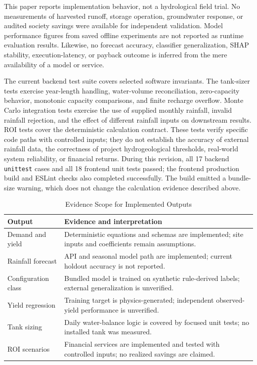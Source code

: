 \documentclass[conference]{IEEEtran}
\begin{document}
This paper reports implementation behavior, not a hydrological field
trial. No measurements of harvested runoff, storage operation, groundwater
response, or audited society savings were available for independent
validation. Model performance figures from saved offline experiments
are not reported as runtime evaluation results. Likewise, no forecast
accuracy, classifier generalization, SHAP stability, execution-latency,
or payback outcome is inferred from the mere availability of a model or
service.

The current backend test suite covers selected software invariants. The
tank-sizer tests exercise year-length handling, water-volume
reconciliation, zero-capacity behavior, monotonic capacity comparisons,
and finite recharge overflow. Monte Carlo integration tests exercise the
use of supplied monthly rainfall, invalid rainfall rejection, and the
effect of different rainfall inputs on downstream results. ROI tests
cover the deterministic calculation contract. These tests verify
specific code paths with controlled inputs; they do not establish the
accuracy of external rainfall data, the correctness of project
hydrogeological thresholds, real-world system reliability, or financial
returns. During this revision, all 17 backend \texttt{unittest} cases and
all 18 frontend unit tests passed; the frontend production build and
ESLint checks also completed successfully. The build emitted a
bundle-size warning, which does not change the calculation evidence
described above.

\begin{table}[htbp]
\caption{Evidence Scope for Implemented Outputs}
\label{tab:evidence}
\centering
\small
\begin{tabular}{p{}p{}}
\toprule
\textbf{Output} & \textbf{Evidence and interpretation}\\
\midrule
Demand and yield & Deterministic equations and schemas are implemented; site inputs and coefficients remain assumptions.\\
Rainfall forecast & API and seasonal model path are implemented; current holdout accuracy is not reported.\\
Configuration class & Bundled model is trained on synthetic rule-derived labels; external generalization is unverified.\\
Yield regression & Training target is physics-generated; independent observed-yield performance is unverified.\\
Tank sizing & Daily water-balance logic is covered by focused unit tests; no installed tank was measured.\\
ROI scenarios & Financial services are implemented and tested with controlled inputs; no realized savings are claimed.\\
\bottomrule
\end{tabular}
\end{table}
\end{document}
